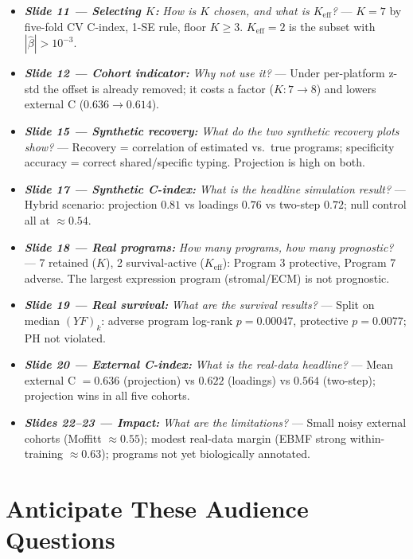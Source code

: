 \documentclass[11pt]{article}
\newcommand{\actioncue}[1]{\textit{\textbf{#1}}}
\begin{document}
\begin{itemize}
\item \actioncue{Slide 11 --- Selecting $K$:} \emph{How is $K$ chosen, and what is $K_{\text{eff}}$?} --- $K = 7$
by five-fold CV C-index, 1-SE rule, floor $K \ge 3$. $K_{\text{eff}} = 2$ is the subset with
$|\hat\beta| > 10^{-3}$.

\item \actioncue{Slide 12 --- Cohort indicator:} \emph{Why not use it?} --- Under per-platform z-std the offset is
already removed; it costs a factor ($K: 7 \to 8$) and lowers external C ($0.636 \to 0.614$).

\item \actioncue{Slide 15 --- Synthetic recovery:} \emph{What do the two synthetic recovery plots show?} ---
Recovery = correlation of estimated vs.\ true programs; specificity accuracy = correct shared/specific
typing. Projection is high on both.

\item \actioncue{Slide 17 --- Synthetic C-index:} \emph{What is the headline simulation result?} --- Hybrid
scenario: projection $0.81$ vs loadings $0.76$ vs two-step $0.72$; null control all at $\approx 0.54$.

\item \actioncue{Slide 18 --- Real programs:} \emph{How many programs, how many prognostic?} --- 7 retained
($K$), 2 survival-active ($K_{\text{eff}}$): Program 3 protective, Program 7 adverse. The largest
expression program (stromal/ECM) is not prognostic.

\item \actioncue{Slide 19 --- Real survival:} \emph{What are the survival results?} --- Split on median $(YF)_k$:
adverse program log-rank $p = 0.00047$, protective $p = 0.0077$; PH not violated.

\item \actioncue{Slide 20 --- External C-index:} \emph{What is the real-data headline?} --- Mean external C
$= 0.636$ (projection) vs $0.622$ (loadings) vs $0.564$ (two-step); projection wins in all five
cohorts.

\item \actioncue{Slides 22--23 --- Impact:} \emph{What are the limitations?} --- Small noisy external cohorts (Moffitt
$\approx 0.55$); modest real-data margin (EBMF strong within-training $\approx 0.63$); programs not
yet biologically annotated.
\end{itemize}

\section*{Anticipate These Audience Questions}
\end{document}
